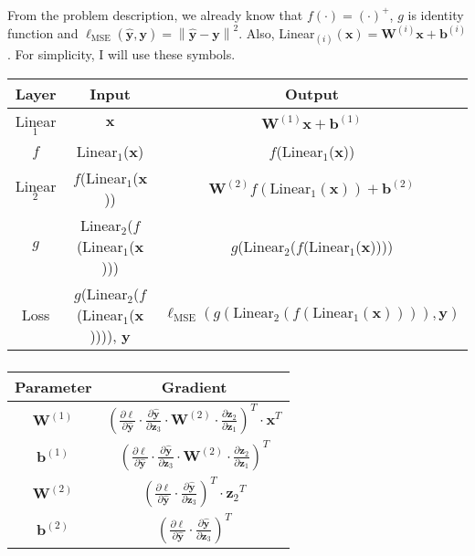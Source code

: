 \documentclass[a4paper]{article}
\newcommand\norm[1]{\left\lVert#1\right\rVert}
\begin{document}
\subsubsection{} %
From the problem description, we already know that $f(\cdot)=(\cdot)^+$, $g$ is identity function and $\ell_{\text{MSE}}(\bm{\hat{y}}, \bm{y}) = \norm{\bm{\hat{y}}-\bm{y}}^2$. Also, Linear$_{(i)}(\bm{x})=\bm{W}^{(i)}\bm{x}+\bm{b}^{(i)}$. For simplicity, I will use these symbols.
\begin{center}
	\begin{tabular}{|c|c|c|}
		\hline
		\textbf{Layer} & \textbf{Input} & \textbf{Output} \\
		\hline
		Linear$_1$ & $\bm{x}$ & $\bm{W}^{(1)}\bm{x}+\bm{b}^{(1)}$ \\
		\hline
		$f$ & Linear$_1$($\bm{x}$) & $f$(Linear$_1$($\bm{x}$)) \\
		\hline
		Linear$_2$ & $f$(Linear$_1$($\bm{x}$)) & $\bm{W}^{(2)}f(\text{Linear}_1(\bm{x}))+\bm{b}^{(2)}$ \\
		\hline
		$g$ & Linear$_2$($f$(Linear$_1$($\bm{x}$))) & $g$(Linear$_2$($f$(Linear$_1$($\bm{x}$)))) \\
		\hline
		Loss & $g$(Linear$_2$($f$(Linear$_1$($\bm{x}$)))), $\bm{y}$ & $\ell_{\text{MSE}}(g(\text{Linear}_2(f(\text{Linear}_1(\bm{x})))), \bm{y})$ \\
		\hline
	\end{tabular}
\end{center}

\subsubsection{} %
\begin{center}
	\begin{tabular}{|c|c|}
		\hline
		\textbf{Parameter} & \textbf{Gradient} \\
		\hline
		$\bm{W}^{(1)}$ & $(\frac{\partial{\ell}}{\partial{\bm{\hat{y}}}}\cdot \frac{\partial{\bm{\hat{y}}}}{\partial{\bm{z}_3}}\cdot \bm{W}^{(2)}\cdot \frac{\partial{\bm{z}_2}}{\partial{\bm{z}_1}})^T\cdot \bm{x}^T$ \\
		\hline
		$\bm{b}^{(1)}$ & $(\frac{\partial{\ell}}{\partial{\bm{\hat{y}}}}\cdot \frac{\partial{\bm{\hat{y}}}}{\partial{\bm{z}_3}}\cdot \bm{W}^{(2)}\cdot \frac{\partial{\bm{z}_2}}{\partial{\bm{z}_1}})^T$ \\
		\hline
		$\bm{W}^{(2)}$ & $(\frac{\partial{\ell}}{\partial{\bm{\hat{y}}}}\cdot \frac{\partial{\bm{\hat{y}}}}{\partial{\bm{z}_3}})^T\cdot {\bm{z}_2}^T$ \\
		\hline
		$\bm{b}^{(2)}$ & $(\frac{\partial{\ell}}{\partial{\bm{\hat{y}}}}\cdot \frac{\partial{\bm{\hat{y}}}}{\partial{\bm{z}_3}})^T$ \\
		\hline
	\end{tabular}
\end{center}
\end{document}
